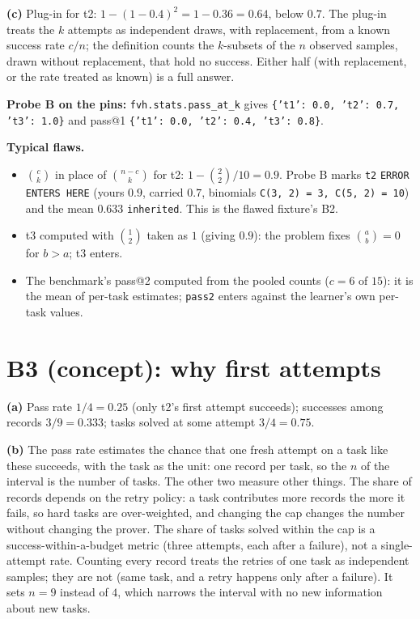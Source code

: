 \documentclass[11pt]{article}
\begin{document}
\textbf{(c)} Plug-in for t2: $1 - (1 - 0.4)^2 = 1 - 0.36 = 0.64$, below
$0.7$. The plug-in treats the $k$ attempts as independent draws, with
replacement, from a known success rate $c/n$; the definition counts the
$k$-subsets of the $n$ observed samples, drawn without replacement, that hold
no success. Either half (with replacement, or the rate treated as known) is a
full answer.

\textbf{Probe B on the pins:} \texttt{fvh.stats.pass\_at\_k} gives
\texttt{\{'t1': 0.0, 't2': 0.7, 't3': 1.0\}} and pass@1
\texttt{\{'t1': 0.0, 't2': 0.4, 't3': 0.8\}}.

\textbf{Typical flaws.}
\begin{itemize}
\item $\binom{c}{k}$ in place of $\binom{n - c}{k}$ for t2:
  $1 - \binom{2}{2}/10 = 0.9$. Probe B marks \texttt{t2} \texttt{ERROR ENTERS
  HERE} (yours $0.9$, carried $0.7$, binomials \texttt{C(3, 2) = 3, C(5, 2) =
  10}) and the mean $0.633$ \texttt{inherited}. This is the flawed fixture's
  B2.
\item t3 computed with $\binom{1}{2}$ taken as $1$ (giving $0.9$): the
  problem fixes $\binom{a}{b} = 0$ for $b > a$; t3 enters.
\item The benchmark's pass@2 computed from the pooled counts
  ($c = 6$ of $15$): it is the mean of per-task estimates; \texttt{pass2}
  enters against the learner's own per-task values.
\end{itemize}

\section*{B3 (concept): why first attempts}

\textbf{(a)} Pass rate $1/4 = 0.25$ (only t2's first attempt succeeds);
successes among records $3/9 = 0.333$; tasks solved at some attempt
$3/4 = 0.75$.

\textbf{(b)} The pass rate estimates the chance that one fresh attempt on a
task like these succeeds, with the task as the unit: one record per task, so
the $n$ of the interval is the number of tasks. The other two measure other
things. The share of records depends on the retry policy: a task contributes
more records the more it fails, so hard tasks are over-weighted, and changing
the cap changes the number without changing the prover. The share of tasks
solved within the cap is a success-within-a-budget metric (three attempts,
each after a failure), not a single-attempt rate. Counting every record treats
the retries of one task as independent samples; they are not (same task, and
a retry happens only after a failure). It sets $n = 9$ instead of $4$, which
narrows the interval with no new information about new tasks.
\end{document}
